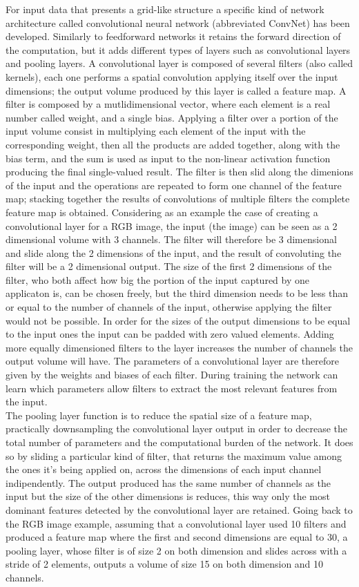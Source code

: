 \documentclass[12pt]{article}
\begin{document}
For input data that presents a grid-like structure a specific kind of network architecture called convolutional neural network (abbreviated ConvNet) has been developed. Similarly to feedforward networks it retains the forward direction of the computation, but it adds different types of layers such as convolutional layers and pooling layers. A convolutional layer is composed of several filters (also called kernels), each one performs a spatial convolution applying itself over the input dimensions; the output volume produced by this layer is called a feature map.
A filter is composed by a mutlidimensional vector, where each element is a real number called weight, and a single bias. Applying a filter over a portion of the input volume consist in multiplying each element of the input with the corresponding  weight, then all the products are added together, along with the bias term, and the sum is used as input to the non-linear activation function producing the final single-valued result. The filter is then slid along the dimenions of the input and the operations are repeated to form one channel of the feature map; stacking together the results of convolutions of multiple filters the complete feature map is obtained. Considering as an example the case of creating a convolutional layer for a RGB image, the input (the image) can be seen as a 2 dimensional volume with 3 channels. The filter will therefore be 3 dimensional and slide along the 2 dimensions of the input, and the result of convoluting the filter will be a 2 dimensional output. The size of the first 2 dimensions of the filter, who both affect how big the portion of the input captured by one applicaton is, can be chosen freely, but the third dimension needs to be less than or equal to the number of channels of the input, otherwise applying the filter would not be possible. In order for the sizes of the output dimensions to be equal to the input ones the input can be padded with zero valued elements. Adding more equally dimensioned filters to the layer increases the number of channels the output volume will have. The parameters of a convolutional layer are therefore given by the weights and biases of each filter. During training the network can learn which parameters allow filters to extract the most relevant features from the input.\\
The pooling layer function is to reduce the spatial size of a feature map, practically downsampling the convolutional layer output in order to decrease the total number of parameters and the computational burden of the network. It does so by sliding a particular kind of filter, that returns the maximum value among the ones it's being applied on, across the dimensions of each input channel indipendently. The output produced has the same number of channels as the input but the size of the other dimensions is reduces, this way only the most dominant features detected by the convolutional layer are retained. Going back to the RGB image example, assuming that a convolutional layer used 10 filters and produced a feature map where the first and second dimensions are equal to 30, a pooling layer, whose filter is of size 2 on both dimension and slides across with a stride of 2 elements, outputs a volume of size 15 on both dimension and 10 channels.\\
\end{document}
